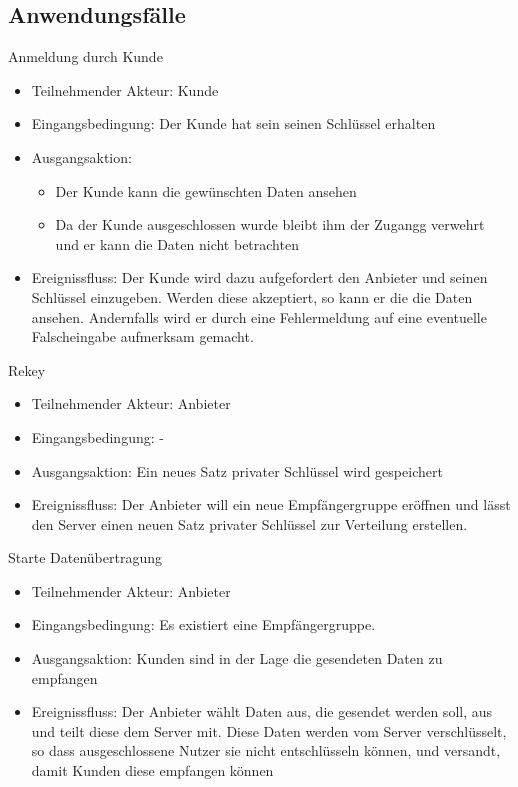 \documentclass[a4paper,10pt]{scrartcl}
\begin{document}
\subsection{Anwendungsfälle}
\begin{usecase}
 {Anmeldung durch Kunde
   \begin{itemize}
   \item Teilnehmender Akteur: Kunde
   \item Eingangsbedingung: Der Kunde hat sein seinen Schlüssel erhalten
   \item Ausgangsaktion: 
       \begin{itemize}
       \item Der Kunde kann die gewünschten Daten ansehen
       \item Da der Kunde ausgeschlossen wurde bleibt ihm der Zugangg verwehrt und er kann die Daten nicht betrachten
       \end{itemize}
   \item Ereignissfluss: Der Kunde wird dazu aufgefordert den Anbieter und seinen Schlüssel einzugeben. Werden diese akzeptiert, so kann er die
             die Daten ansehen. Andernfalls wird er durch eine Fehlermeldung auf eine eventuelle Falscheingabe aufmerksam gemacht.
   \end{itemize}
}
 {Rekey
   \begin{itemize}
   \item Teilnehmender Akteur: Anbieter
   \item Eingangsbedingung: -
   \item Ausgangsaktion: Ein neues Satz privater Schlüssel wird gespeichert
   \item Ereignissfluss: Der Anbieter will ein neue Empfängergruppe eröffnen und lässt den Server einen neuen Satz privater Schlüssel zur
              Verteilung erstellen.
   \end{itemize}
}
 {Starte Datenübertragung
   \begin{itemize}
   \item Teilnehmender Akteur: Anbieter
   \item Eingangsbedingung: Es existiert eine Empfängergruppe.
   \item Ausgangsaktion: Kunden sind in der Lage die gesendeten Daten zu empfangen
   \item Ereignissfluss: Der Anbieter wählt Daten aus, die gesendet werden soll, aus und teilt diese dem Server mit. Diese Daten werden vom 
             Server verschlüsselt, so dass ausgeschlossene Nutzer sie nicht entschlüsseln können, und versandt, damit Kunden diese empfangen können

\end{itemize}}
\end{usecase}
\end{document}

